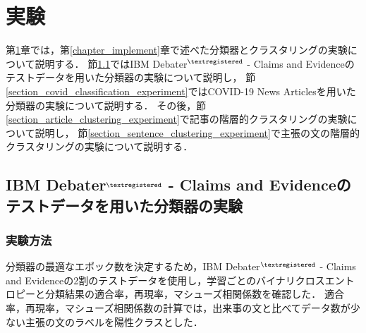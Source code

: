 \documentclass[12pt,a4j]{jreport}
\begin{document}


\chapter{実験}
\label{chapter_experiment}

第\ref{chapter_experiment}章では，第\ref{chapter_implement}章で述べた分類器とクラスタリングの実験について説明する．
節\ref{section_ibm_classification_experiment}ではIBM Debater$^{\textregistered}$ - Claims and Evidenceのテストデータを用いた分類器の実験について説明し，
節\ref{section_covid_classification_experiment}ではCOVID-19 News Articlesを用いた分類器の実験について説明する．
その後，節\ref{section_article_clustering_experiment}で記事の階層的クラスタリングの実験について説明し，
節\ref{section_sentence_clustering_experiment}で主張の文の階層的クラスタリングの実験について説明する．

\section{IBM Debater$^{\textregistered}$ - Claims and Evidenceのテストデータを用いた分類器の実験}
\label{section_ibm_classification_experiment}

\subsection{実験方法}
分類器の最適なエポック数を決定するため，IBM Debater$^{\textregistered}$ - Claims and Evidenceの2割のテストデータを使用し，学習ごとのバイナリクロスエントロピーと分類結果の適合率，再現率，マシューズ相関係数を確認した．
適合率，再現率，マシューズ相関係数の計算では，出来事の文と比べてデータ数が少ない主張の文のラベルを陽性クラスとした．
\end{document}

